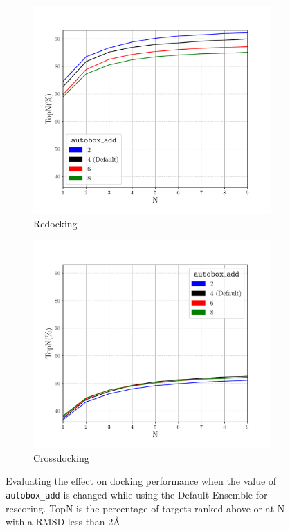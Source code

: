 \documentclass[journal=jcisd8,manuscript=article]{achemso}
\begin{document}
\begin{figure}    
        \begin{subfigure}[b]{0.48\textwidth}    
		\centering
		\includegraphics[width=\textwidth]{figures/redocking/sweep_autobox_add_line.pdf}
		\caption{Redocking}
		\label{fig:AutoboxAddRedock}
        \end{subfigure}    
        \begin{subfigure}[b]{0.48\textwidth}    
		\centering
		\includegraphics[width=\textwidth]{figures/crossdocking/sweep_autobox_add_line.pdf}
		\caption{Crossdocking}
		\label{fig:AutoboxAddCrossdock}
        \end{subfigure}    
	\caption{Evaluating the effect on docking performance when the value of \texttt{autobox\_add} is changed while using the Default Ensemble for rescoring. TopN is the percentage of targets ranked above or at N with a RMSD less than 2{\AA}}
	\label{fig:AutoboxAdd}
\end{figure}  
\end{document}
